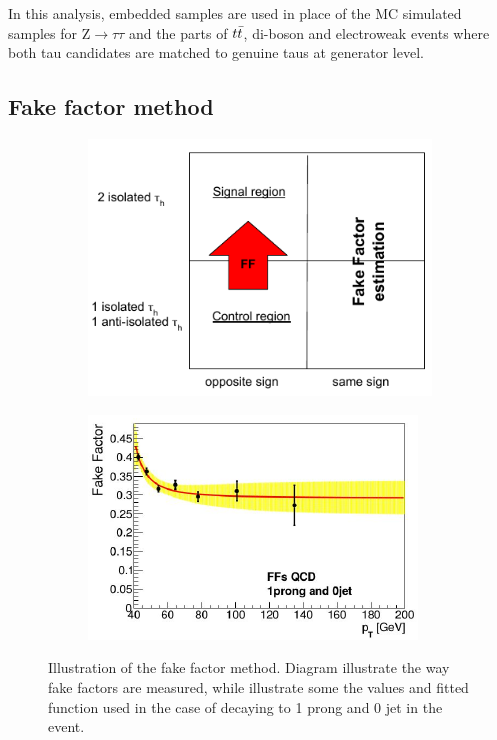 In this analysis, embedded samples are used in place of the MC simulated samples for $\mathrm{Z}\rightarrow \tau\tau$ and the parts of $t\Bar{t}$, di-boson and electroweak events where both tau candidates are matched to genuine taus at generator level.

\subsection{Fake factor method}
\label{sec:ff}
\begin{figure}
\centering
\begin{subfigure}[b]{0.5\textwidth}
  \centering
  \includegraphics[width=\textwidth]{Images/FF_method.png}
  \caption{\label{fig:FF_method}}
\end{subfigure}%
\begin{subfigure}[b]{0.5\textwidth}
  \centering
  \includegraphics[width=\textwidth]{Images/FF_values.png}
  \caption{\label{fig:FF_values}}
\end{subfigure}
\caption{Illustration of the fake factor method. Diagram  illustrate the way fake factors are measured, while  illustrate some the values and fitted function used in the case of \tauh decaying to 1 prong and 0 jet in the event.}
\label{fig:FF_illustration}
\end{figure}


